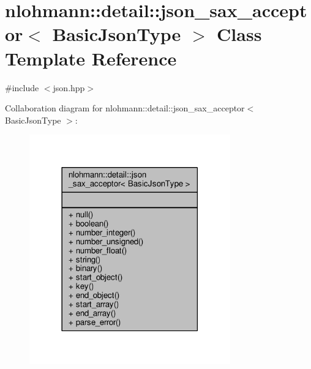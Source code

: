 \hypertarget{classnlohmann_1_1detail_1_1json__sax__acceptor}{}\section{nlohmann\+:\+:detail\+:\+:json\+\_\+sax\+\_\+acceptor$<$ Basic\+Json\+Type $>$ Class Template Reference}
\label{classnlohmann_1_1detail_1_1json__sax__acceptor}


{\ttfamily \#include $<$json.\+hpp$>$}



Collaboration diagram for nlohmann\+:\+:detail\+:\+:json\+\_\+sax\+\_\+acceptor$<$ Basic\+Json\+Type $>$\+:
\nopagebreak
\begin{figure}[H]
\begin{center}
\leavevmode
\includegraphics[width=246pt]{classnlohmann_1_1detail_1_1json__sax__acceptor__coll__graph}
\end{center}
\end{figure}
